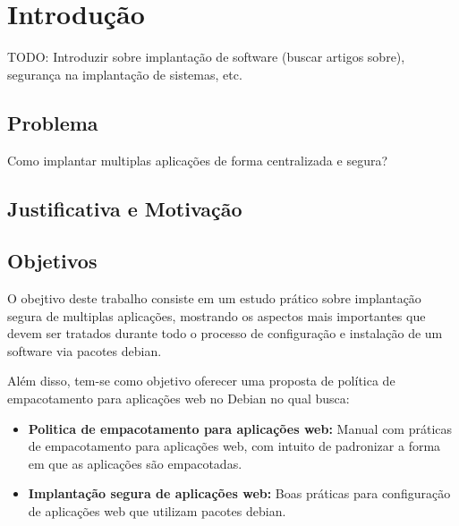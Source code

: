 \chapter{Introdução}
\label{cap-introducao}

TODO: Introduzir sobre implantação de software (buscar artigos sobre), segurança
na implantação de sistemas, etc.

\section{Problema}
%

Como implantar multiplas aplicações de forma centralizada e segura?

\section{Justificativa e Motivação}


\section{Objetivos}

%

O obejtivo deste trabalho consiste em um estudo prático sobre implantação segura
de multiplas aplicações, mostrando os aspectos mais importantes que devem ser
tratados durante todo o processo de configuração e instalação de um software via
pacotes debian.

%

Além disso, tem-se como objetivo oferecer uma proposta de política de
empacotamento para aplicações web no Debian no qual busca:

\begin{itemize}
  \item  \textbf{Politica de empacotamento para aplicações web:} Manual com
  práticas de empacotamento para aplicações web, com intuito de padronizar a
  forma em que as aplicações são empacotadas.
  \item  \textbf{Implantação segura de aplicações web:} Boas práticas para
  configuração de aplicações web que utilizam pacotes debian.
\end{itemize}

